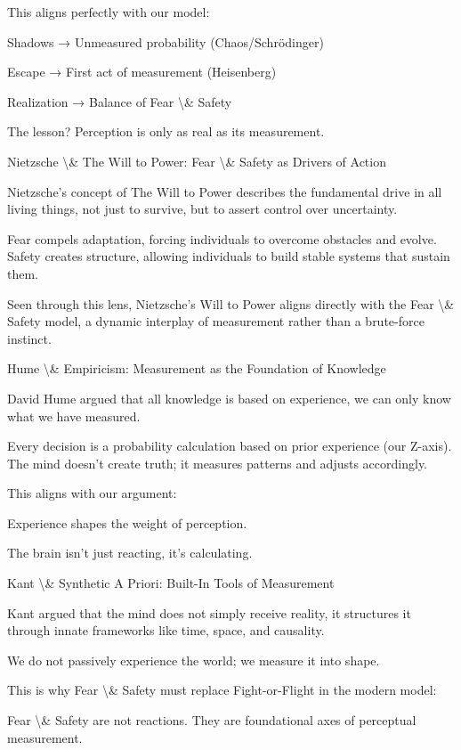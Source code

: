 \documentclass[12pt]{article}
\begin{document}
This aligns perfectly with our model:

Shadows → Unmeasured probability (Chaos/Schrödinger)

Escape → First act of measurement (Heisenberg)

Realization → Balance of Fear \textbackslash{}& Safety

The lesson?
Perception is only as real as its measurement.

Nietzsche \textbackslash{}& The Will to Power: Fear \textbackslash{}& Safety as Drivers of Action

Nietzsche’s concept of The Will to Power describes the fundamental drive in all living things, not just to survive, but to assert control over uncertainty.

Fear compels adaptation, forcing individuals to overcome obstacles and evolve.
Safety creates structure, allowing individuals to build stable systems that sustain them.

Seen through this lens, Nietzsche’s Will to Power aligns directly with the Fear \textbackslash{}& Safety model, 
a dynamic interplay of measurement rather than a brute-force instinct.

Hume \textbackslash{}& Empiricism: Measurement as the Foundation of Knowledge

David Hume argued that all knowledge is based on experience, we can only know what we have measured.

Every decision is a probability calculation based on prior experience (our Z-axis).
The mind doesn’t create truth; it measures patterns and adjusts accordingly.

This aligns with our argument:

Experience shapes the weight of perception.

The brain isn’t just reacting, it’s calculating.

Kant \textbackslash{}& Synthetic A Priori: Built-In Tools of Measurement

Kant argued that the mind does not simply receive reality, it structures it through innate frameworks like time, space, and causality.

We do not passively experience the world; we measure it into shape.

This is why Fear \textbackslash{}& Safety must replace Fight-or-Flight in the modern model:

Fear \textbackslash{}& Safety are not reactions. They are foundational axes of perceptual measurement.
\end{document}
